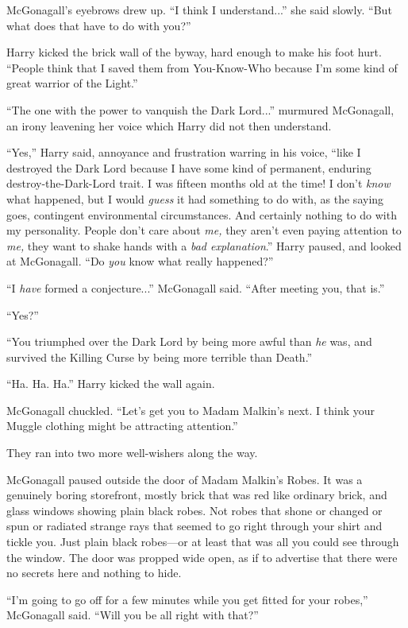 McGonagall’s eyebrows drew up. “I think I understand...” she said slowly. “But what does that have to do with you?”

Harry kicked the brick wall of the byway, hard enough to make his foot hurt. “People think that I saved them from You-Know-Who because I’m some kind of great warrior of the Light.”

“The one with the power to vanquish the Dark Lord...” murmured McGonagall, an irony leavening her voice which Harry did not then understand.

“Yes,” Harry said, annoyance and frustration warring in his voice, “like I destroyed the Dark Lord because I have some kind of permanent, enduring destroy-the-Dark-Lord trait. I was fifteen months old at the time! I don’t \emph{know} what happened, but I would \emph{guess} it had something to do with, as the saying goes, contingent environmental circumstances. And certainly nothing to do with my personality. People don’t care about \emph{me,} they aren’t even paying attention to \emph{me,} they want to shake hands with a \emph{bad explanation}.” Harry paused, and looked at McGonagall. “Do \emph{you} know what really happened?”

“I \emph{have} formed a conjecture...” McGonagall said. “After meeting you, that is.”

“Yes?”

“You triumphed over the Dark Lord by being more awful than \emph{he} was, and survived the Killing Curse by being more terrible than Death.”

“Ha. Ha. Ha.” Harry kicked the wall again.

McGonagall chuckled. “Let’s get you to Madam Malkin’s next. I think your Muggle clothing might be attracting attention.”

They ran into two more well-wishers along the way.

McGonagall paused outside the door of Madam Malkin’s Robes. It was a genuinely boring storefront, mostly brick that was red like ordinary brick, and glass windows showing plain black robes. Not robes that shone or changed or spun or radiated strange rays that seemed to go right through your shirt and tickle you. Just plain black robes—or at least that was all you could see through the window. The door was propped wide open, as if to advertise that there were no secrets here and nothing to hide.

“I’m going to go off for a few minutes while you get fitted for your robes,” McGonagall said. “Will you be all right with that?”


